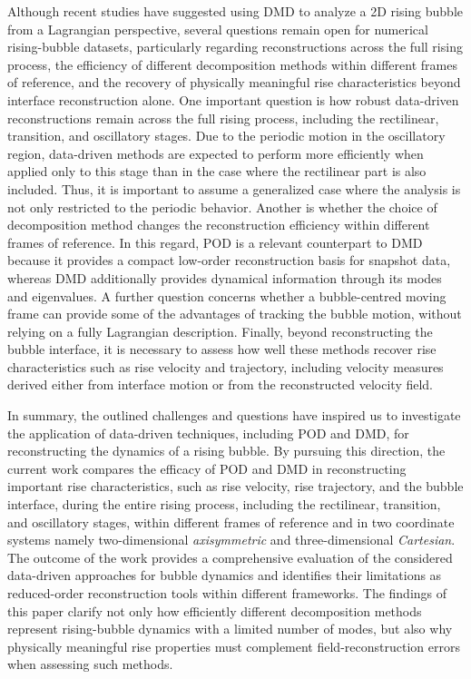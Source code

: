 \documentclass[a4paper,fleqn]{cas-sc}
\begin{document}
	Although recent studies have suggested using DMD to analyze a 2D rising bubble from a Lagrangian perspective, several questions remain open for numerical rising-bubble datasets, particularly regarding reconstructions across the full rising process, the efficiency of different decomposition methods within different frames of reference, and the recovery of physically meaningful rise characteristics beyond interface reconstruction alone. One important question is how robust data-driven reconstructions remain across the full rising process, including the rectilinear, transition, and oscillatory stages. Due to the periodic motion in the oscillatory region, data-driven methods are expected to perform more efficiently when applied only to this stage than in the case where the rectilinear part is also included. Thus, it is important to assume a generalized case where the analysis is not only restricted to the periodic behavior. Another is whether the choice of decomposition method changes the reconstruction efficiency within different frames of reference. In this regard, POD is a relevant counterpart to DMD because it provides a compact low-order reconstruction basis for snapshot data, whereas DMD additionally provides dynamical information through its modes and eigenvalues. A further question concerns whether a bubble-centred moving frame can provide some of the advantages of tracking the bubble motion, without relying on a fully Lagrangian description. Finally, beyond reconstructing the bubble interface, it is necessary to assess how well these methods recover rise characteristics such as rise velocity and trajectory, including velocity measures derived either from interface motion or from the reconstructed velocity field.
	
	In summary, the outlined challenges and questions have inspired us to investigate the application of data-driven techniques, including POD and DMD, for reconstructing the dynamics of a rising bubble. By pursuing this direction, the current work compares the efficacy of POD and DMD in reconstructing important rise characteristics, such as rise velocity, rise trajectory, and the bubble interface, during the entire rising process, including the rectilinear, transition, and oscillatory stages, within different frames of reference and in two coordinate systems namely two-dimensional \textit{axisymmetric} and three-dimensional \textit{Cartesian}. The outcome of the work provides a comprehensive evaluation of the considered data-driven approaches for bubble dynamics and identifies their limitations as reduced-order reconstruction tools within different frameworks. The findings of this paper clarify not only how efficiently different decomposition methods represent rising-bubble dynamics with a limited number of modes, but also why physically meaningful rise properties must complement field-reconstruction errors when assessing such methods.
	
\end{document}
